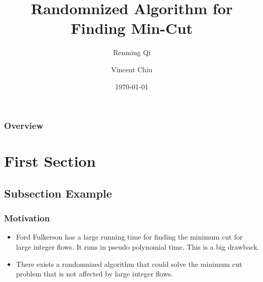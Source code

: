 \documentclass{beamer}
\title[Randomnized Algorithm]{Randomnized Algorithm for Finding Min-Cut } %
\author{Renming Qi \and Vincent Chiu} %
\date{\today} %
\begin{document}
\begin{frame}
\titlepage %
\end{frame}

\begin{frame}
\frametitle{Overview} %
\tableofcontents %
\end{frame}


\section{First Section} %

\subsection{Subsection Example} %




\begin{frame}
\frametitle{Motivation}
\begin{itemize}
	\item Ford Fulkerson has a large running time for finding the minimum cut for large integer flows. It runs in pseudo polynomial time.  This is a big drawback.
	\item There exists a randomnized algorithm that could solve the minimum cut problem that is not affected by large integer flows.
\end{itemize}


\end{frame}
\end{document}
